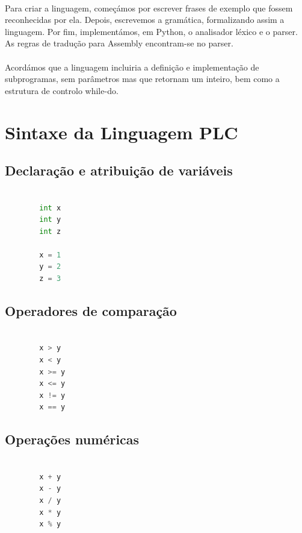 \documentclass[11pt,a4paper]{report}
\begin{document}
    \paragraph{}
    Para criar a linguagem, começámos por escrever frases de exemplo que fossem reconhecidas por ela. Depois, escrevemos a gramática, formalizando assim a linguagem. Por fim, implementámos, em Python, o analisador léxico e o parser. As regras de tradução para Assembly encontram-se no parser.
    \paragraph{}
    Acordámos que a linguagem incluiria a definição e implementação de subprogramas, sem parâmetros mas que retornam um inteiro, bem como a estrutura de controlo while-do.

    \section{Sintaxe da Linguagem PLC}

    \subsection{Declaração e atribuição de variáveis}
    \begin{lstlisting}[language=Python]
    
        int x
        int y
        int z

        x = 1
        y = 2
        z = 3
    \end{lstlisting}

    \subsection{Operadores de comparação}
    \begin{lstlisting}[language=Python]
    
        x > y
        x < y
        x >= y
        x <= y
        x != y
        x == y
    \end{lstlisting}

    \subsection{Operações numéricas}
    \begin{lstlisting}[language=Python]
    
        x + y
        x - y
        x / y
        x * y
        x % y
    \end{lstlisting}
\end{document}
